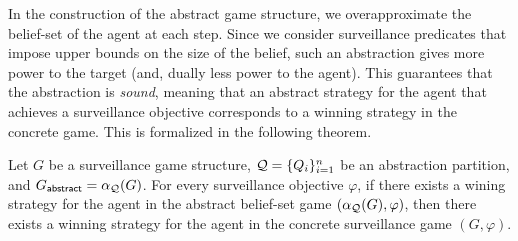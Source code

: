 In the construction of the abstract  game structure, we overapproximate the belief-set of the agent at each step. Since we consider surveillance predicates that impose upper bounds on the size of the belief, such an abstraction  gives more power to the target (and, dually less power to the agent).  This guarantees that the abstraction is \emph{sound}, meaning that an abstract strategy for the agent that achieves a surveillance objective corresponds to a winning strategy in the concrete game. This is formalized in the following theorem.

\begin{theorem}
Let $G$ be a surveillance game structure, $\mathcal{Q} = \{Q_i\}_{i=1}^n$ be an abstraction partition, and $G_{\mathsf{abstract}} = \alpha_{\mathcal{Q}}(G)$. For every surveillance objective $\varphi$, if there exists a wining strategy for the agent in the abstract belief-set game $(\alpha_{\mathcal{Q}}(G),\varphi)$, then there exists a winning strategy for the agent in the concrete surveillance game $(G,\varphi)$.
\end{theorem}
